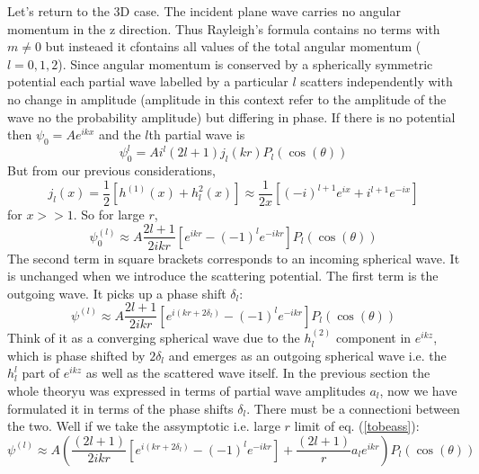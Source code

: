 Let's return to the 3D  case. The incident plane wave carries no angular momentum in the z direction. Thus Rayleigh's formula contains no terms with $m \neq 0$ but insteaed it cfontains all values of the total angular momentum ($l = 0, 1, 2$). Since angular momentum is conserved by a spherically symmetric potential each partial wave labelled by a particular $l$ scatters independently with no change in amplitude (amplitude in this context refer to the amplitude of the wave no the probability amplitude) but differing in phase. If there is no potential then $\psi_{0} = A e^{ikx}$ and the $l$th partial wave is
\begin{equation}
\psi^{l}_{0} = A i^{l} (2l +1) j_{l}(kr)P_{l}(\cos(\theta))
\end{equation}
But from our previous considerations,
\begin{equation}
j_{l}(x) = \frac{1}{2} \left[h^{(1)}(x) + h^{2}_{l}(x) \right] \approx \frac{1}{2x} \left[(-i)^{l+1} e^{ix} + i^{l+1}e^{-ix} \right]
\end{equation}
for $x >>1$. So for large $r$,
\begin{equation}
\psi^{(l)}_{0} \approx A \frac{2l + 1}{2ikr} \left[e^{ikr} - {(-1)}^{l}e^{-ikr}\right] P_{l}(\cos(\theta))
\end{equation}
The second term in square brackets corresponds to an incoming spherical wave. It is unchanged when we introduce the scattering potential. The first term is the outgoing wave. It picks up a phase shift $\delta_{l}$:
\begin{equation}
	\label{tobeass}
\psi^{(l)} \approx A \frac{2l + 1}{2ikr} \left[e^{i(kr + 2\delta_{l})} - {(-1)}^{l}e^{-ikr}\right] P_{l}(\cos(\theta))
\end{equation}
Think of it as a converging spherical wave due to the $h^{(2)}_{l}$ component in $e^{ikz}$, which is phase shifted by $2\delta_{l}$ and emerges as an outgoing spherical wave i.e. the $h^{l}_{l}$ part of $e^{ikz}$ as well  as the scattered wave itself. In the previous section the whole theoryu was expressed in terms of partial wave amplitudes $a_{l}$, now we have formulated it in terms of the phase shifts $\delta_{l}$. There must be a connectioni between the two. Well if we take the assymptotic i.e. large $r$ limit of eq. (\ref{tobeass}):
\begin{equation}
\psi^{(l)} \approx A\left( \frac{(2l + 1)}{2ikr} \left[e^{i(kr + 2\delta_{l})} - {(-1)}^{l}e^{-ikr}\right] + \frac{(2l + 1)}{r}a_{l}e^{ikr} \right) P_{l}(\cos(\theta))
\end{equation}

